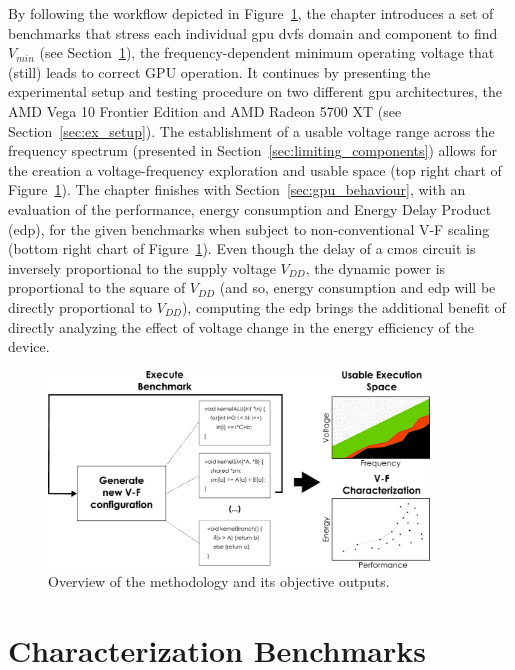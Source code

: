 By following the workflow depicted in Figure~\ref{fig:gpu_char}, the chapter introduces a set of benchmarks that stress each individual \acrshort{gpu} \acrshort{dvfs} domain and component to find $V_{min}$ (see Section~\ref{sec:char_meth}), the frequency-dependent minimum operating voltage that (still) leads to correct GPU operation. It continues by presenting the experimental setup and testing procedure on two different \acrshort{gpu} architectures, the AMD Vega 10 Frontier Edition and AMD Radeon 5700 XT (see Section~\ref{sec:ex_setup}). The establishment of a usable voltage range across the frequency spectrum (presented in Section~\ref{sec:limiting_components}) allows for the creation a voltage-frequency exploration and usable space (top right chart of Figure~\ref{fig:gpu_char}). The chapter finishes with Section~\ref{sec:gpu_behaviour}, with an evaluation of the performance, energy consumption and Energy Delay Product (\acrshort{edp}), for the given benchmarks when subject to non-conventional V-F scaling (bottom right chart of Figure~\ref{fig:gpu_char}). 
Even though the delay of a \acrshort{cmos} circuit is inversely proportional to the supply voltage $V_{DD}$, the dynamic power is proportional to the square of $V_{DD}$ (and so, energy consumption and \acrshort{edp} will be directly proportional to $V_{DD}$), computing the \acrshort{edp} brings the additional benefit of directly analyzing the effect of voltage change in the energy efficiency of the device.

\begin{figure}[htb]
  \centering
  \includegraphics[width=0.9\textwidth]{Figures/GPU_characterization/gpu_char.pdf}
  \caption{Overview of the methodology and its objective outputs.}
  \label{fig:gpu_char}
\end{figure}




\section{Characterization Benchmarks}
\label{sec:char_meth}

